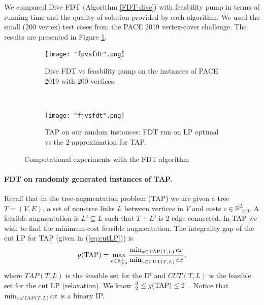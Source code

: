 We compared Dive FDT (Algorithm \ref{FDT-dive}) with feasbility pump \cite{fp1} in terms of running time
and the quality of solution provided by each algorithm. We used the small (200 vertex) test cases from the PACE 2019 vertex-cover challenge. The results are presented in Figure \ref{fpvsfdt}. 

\begin{figure}[h!]
\begin{subfigure}{.5\textwidth}
\centering
	\texttt{[image: "fpvsfdt".png]}
	\caption{Dive FDT vs feasbility pump on the instances of PACE 2019 \cite{PACE} with 200 vertices.}
	\label{fpvsfdt}
	\end{subfigure}
	$\quad\;$
	\begin{subfigure}{.5\textwidth}
	\centering
	\texttt{[image: "fjvsfdt".png]}
	\caption{TAP on our random instances: FDT run on LP optimal vs the 2-approximation for TAP\cite{FJ81}.}
	\label{fjvsfdt}
	\end{subfigure}
	\caption{Computational experiments with the FDT algorithm}
	\label{fdtcomp}
\end{figure}
\paragraph{FDT on randomly generated instances of TAP.}
Recall that in the tree-augmentation problem (TAP) we are given a tree $T=(V,E)$, a set of non-tree links $L$ between vertices in $V$ and costs $c\in \mathbb{R}^{L}_{\geq 0}$. A feasible augmentation is $L'\subseteq L$ such that $T+L'$ is 2-edge-connected. In TAP we wish to find the minimum-cost feasible augmentation. The integrality gap of the cut LP for TAP (given in (\ref{eq:cutLP})) is
\begin{equation*}
g(\operatorname{{{TAP}}}) = \max_{c\in \mathbb{R}^L_{\geq 0}} \frac{\min_{x\in\operatorname{{{TAP}}}(T,L)} cx}{\min_{x\in\operatorname{{{CUT}}}(T,L)} cx},
\end{equation*}  
where $TAP(T,L)$ is the feasible set for the IP and $CUT(T,L)$ is the feasible set for the cut LP (relaxation).  We know $\frac{3}{2}\leq g(\operatorname{{{TAP}}})\leq 2$~\cite{FJ81,32gaptap}. Notice that $\min_{x\in \operatorname{{{TAP}}}(T,L)}cx$ is a binary IP. 

